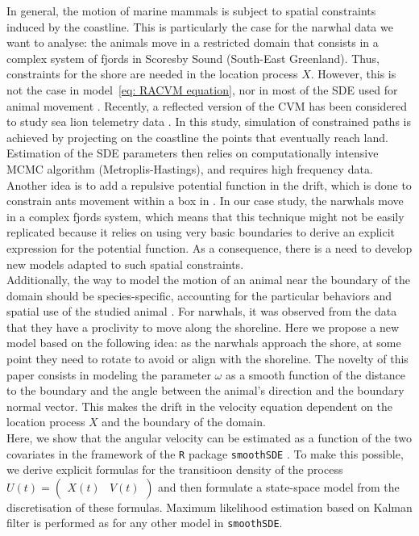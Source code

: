 \documentclass[11pt]{article}
\newcommand {\1}{\mathbb{1}}
\theoremstyle{definition}
\theoremstyle{remark}
\theoremstyle{remark}
\begin{document}
In general, the motion of marine mammals is subject to spatial constraints induced by the coastline. This is particularly the case for the narwhal data we want to analyse: the animals move in a restricted domain that consists in a complex system of fjords in Scoresby Sound (South-East Greenland). Thus, constraints for the shore are needed in the location process $X$. However, this is not the case in model~\ref{eq: RACVM equation}, nor in most of the SDE used for animal movement \cite{johnson_continuoustime_2008,michelot_varying-coefficient_2021,gurarie_correlated_2017}. 
Recently, a reflected version of the CVM has been considered to study sea lion telemetry data \cite{hanks_reflected_2017}.
In this study, simulation of constrained paths is achieved by projecting on the coastline the  points that eventually reach land. Estimation of the SDE parameters then relies on computationally intensive MCMC algorithm (Metroplis-Hastings), and requires high frequency data. Another idea is to add a repulsive potential function in the drift, which is done to constrain ants movement within a box in \cite{russell_spatially_2018}. In our case study, the narwhals move in a complex fjords system, which means that this technique might not be easily replicated because it relies on using very basic boundaries to derive an explicit expression for the potential function. As a consequence, there is a need to develop new models adapted to such spatial constraints.\\
Additionally, the way to model the motion of an animal near the boundary of the domain should be species-specific, accounting for the particular behaviors and spatial use of the studied animal \cite{brillinger_simulating_2003}. For narwhals, it was observed from the data that they have a proclivity to move along the shoreline. Here we propose a new model based on the following idea: as the narwhals approach the shore, at some point they need to rotate to avoid or align with the shoreline. The novelty of this paper consists in modeling the parameter $\omega$ as a smooth function of the distance to the boundary and the angle between the animal's direction and the boundary normal vector. This makes the drift in the velocity equation dependent on the location process $X$ and the boundary of the domain.  \\ %



Here, we show that the angular velocity  can be estimated as a function of the two covariates in the framework of the \texttt{R} package \texttt{smoothSDE} \cite{michelot_varying-coefficient_2021}. To make this possible, we derive explicit formulas for the transitioon density of the process $U(t)=\begin{pmatrix} X(t) & V(t) \end{pmatrix}$ and then formulate a state-space model from the discretisation of these formulas. Maximum likelihood estimation based on Kalman filter is performed as for any other model in \texttt{smoothSDE}.\\
\end{document}
